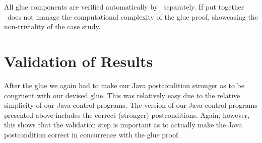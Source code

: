 All glue components are verified automatically by \keym~separately. If put together \keym~does not manage the computational complexity of the glue proof, showcasing the non-triviality of the case study.

\section{Validation of Results}
\label{sec:traffic:val}

After the glue we again had to make our Java postcondition stronger as to be congruent with our devised glue. This was relatively easy due to the relative simplicity of our Java control programs. The version of our Java control programs presented above includes the correct (stronger) postconditions. Again, however, this shows that the validation step is important as to actually make the Java postcondition correct in concurrence with the glue proof.
	